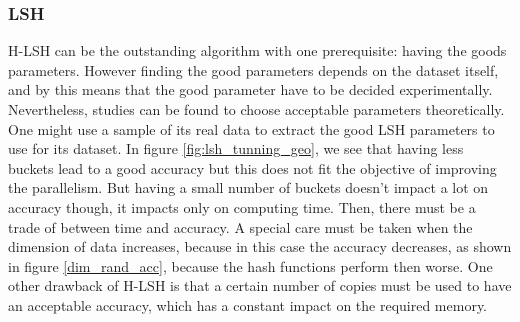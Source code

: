 \subsubsection{LSH}
H-LSH can be the outstanding algorithm with one prerequisite: having the goods parameters.
However finding the good parameters depends on the dataset itself, and by this means that the good parameter have to be decided experimentally. Nevertheless, studies can be found to choose acceptable parameters theoretically.
One might use a sample of its real data to extract the good LSH parameters to use for its dataset.
In figure \ref{fig:lsh_tunning_geo}, we see that having less buckets lead to a good accuracy but this does not fit the objective of improving the parallelism.
But having a small number of buckets doesn't impact a lot on accuracy though, it impacts only on computing time. Then, there must be a trade of between time and accuracy.
A special care must be taken when the dimension of data increases, because in this case the accuracy decreases, as shown in figure \ref{dim_rand_acc}, because the hash functions perform then worse.
One other drawback of H-LSH is that a certain number of copies must be used to have an acceptable accuracy, which has a constant impact on the required memory.


% 


